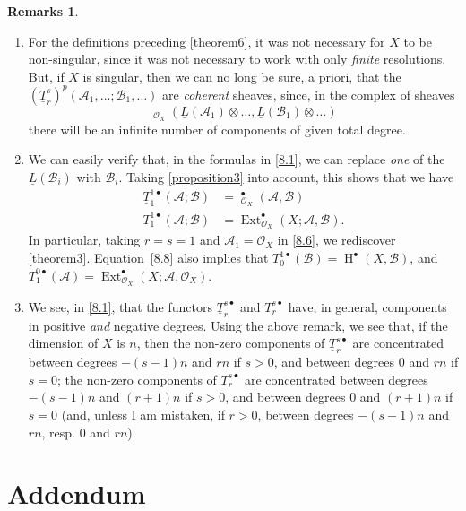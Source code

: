 \documentclass{article}
\theoremstyle{plain}
\theoremstyle{definition}
\newtheorem*{remarks}{Remarks}
\newcommand{\sh}[1]{{\mathscr{#1}}}
\DeclareMathOperator{\Ext}{Ext}
\DeclareMathOperator{\shExt}{\underline{Ext}}
\DeclareMathOperator{\shHom}{\underline{Hom}}
\DeclareMathOperator{\HH}{H}
\newcommand{\oldpage}[1]{\marginpar{\footnotesize$\Big\vert$ \textit{p.~#1}}}
\begin{document}
\oldpage{149-24}
\begin{remarks}
  \begin{enumerate}
    \item For the definitions preceding \cref{theorem6}, it was not necessary for $X$ to be non-singular, since it was not necessary to work with only \emph{finite} resolutions.
      But, if $X$ is singular, then we can no long be sure, a priori, that the $(\underline{T}_r^s)^p(\sh{A}_1,\ldots;\sh{B}_1,\ldots)$ are \emph{coherent} sheaves, since, in the complex of sheaves
      \[
        \shHom_{\sh{O}_X}(\underline{L}(\sh{A}_1)\otimes\ldots,\underline{L}(\sh{B}_1)\otimes\ldots)
      \]
      there will be an infinite number of components of given total degree.
    \item We can easily verify that, in the formulas in \cref{8.1}, we can replace \emph{one} of the $\underline{L}(\sh{B}_i)$ with $\sh{B}_i$.
      Taking \cref{proposition3} into account, this shows that we have
      \[
      \label{8.8}
        \begin{aligned}
          \underline{T}_1^{1\bullet}(\sh{A};\sh{B})
          &= \shExt_{\sh{O}_X}^\bullet(\sh{A},\sh{B})
        \\T_1^{1\bullet}(\sh{A};\sh{B})
          &= \Ext_{\sh{O}_X}^\bullet(X;\sh{A},\sh{B}).
        \end{aligned}
      \tag{8.8}
      \]
      In particular, taking $r=s=1$ and $\sh{A}_1=\sh{O}_X$ in \cref{8.6}, we rediscover \cref{theorem3}.
      Equation~\cref{8.8} also implies that $T_0^{1\bullet}(\sh{B})=\HH^\bullet(X,\sh{B})$, and $T_1^{0\bullet}(\sh{A})=\Ext_{\sh{O}_X}^\bullet(X;\sh{A},\sh{O}_X)$.
    \item We see, in \cref{8.1}, that the functors $\underline{T}_r^{s\bullet}$ and $T_r^{s\bullet}$ have, in general, components in positive \emph{and} negative degrees.
      Using the above remark, we see that, if the dimension of $X$ is $n$, then the non-zero components of $\underline{T}_r^{s\bullet}$ are concentrated between degrees $-(s-1)n$ and $rn$ if $s>0$, and between degrees $0$ and $rn$ if $s=0$; the non-zero components of $T_r^{s\bullet}$ are concentrated between degrees $-(s-1)n$ and $(r+1)n$ if $s>0$, and between degrees $0$ and $(r+1)n$ if $s=0$ (and, unless I am mistaken, if $r>0$, between degrees $-(s-1)n$ and $rn$, resp. $0$ and $rn$).
  \end{enumerate}
\end{remarks}


\section*{Addendum}
\label{addendum}
\end{document}
